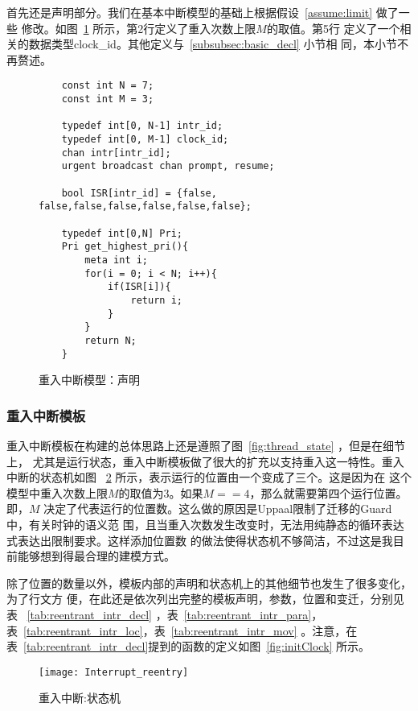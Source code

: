 首先还是声明部分。我们在基本中断模型的基础上根据假设~\ref{assume:limit} 做了一些
修改。如图~\ref{fig:reentrant_decl} 所示，第2行定义了重入次数上限$M$的取值。第5行
定义了一个相关的数据类型clock\_id。其他定义与~\ref{subsubsec:basic_decl} 小节相
同，本小节不再赘述。

\begin{figure}[H]
	\centering
	\begin{lstlisting}
	const int N = 7;
	const int M = 3;
	
	typedef int[0, N-1] intr_id; 
	typedef int[0, M-1] clock_id;
	chan intr[intr_id];
	urgent broadcast chan prompt, resume;
	
	bool ISR[intr_id] = {false, false,false,false,false,false,false};
	
	typedef int[0,N] Pri;
	Pri get_highest_pri(){
		meta int i;
		for(i = 0; i < N; i++){
			if(ISR[i]){
				return i;
			} 
		}
		return N;
	}
	\end{lstlisting}
	\caption{重入中断模型：声明}
	\label{fig:reentrant_decl}
\end{figure}

\subsubsection{重入中断模板}
\label{subsubsec:reentrant_intr}
重入中断模板在构建的总体思路上还是遵照了图~\ref{fig:thread_state} ，但是在细节上，
尤其是运行状态，重入中断模板做了很大的扩充以支持重入这一特性。重入中断的状态机如图
~\ref{fig:Interrupt_reentrant} 所示，表示运行的位置由一个变成了三个。这是因为在
这个模型中重入次数上限$M$的取值为3。如果$M==4$，那么就需要第四个运行位置。即，$M$
决定了代表运行的位置数。这么做的原因是Uppaal限制了迁移的Guard中，有关时钟的语义范
围，且当重入次数发生改变时，无法用纯静态的循环表达式表达出限制要求。这样添加位置数
的做法使得状态机不够简洁，不过这是我目前能够想到得最合理的建模方式。

除了位置的数量以外，模板内部的声明和状态机上的其他细节也发生了很多变化，为了行文方
便，在此还是依次列出完整的模板声明，参数，位置和变迁，分别见表
~\ref{tab:reentrant_intr_decl} ，表~\ref{tab:reentrant_intr_para}，
表~\ref{tab:reentrant_intr_loc}，表~\ref{tab:reentrant_intr_mov} 。注意，在
表~\ref{tab:reentrant_intr_decl}提到的函数的定义如图~\ref{fig:initClock} 所示。

\begin{figure}[H]
	\centering
	\texttt{[image: Interrupt\_reentry]}
	\caption{重入中断:状态机}
	\label{fig:Interrupt_reentrant}
\end{figure}

